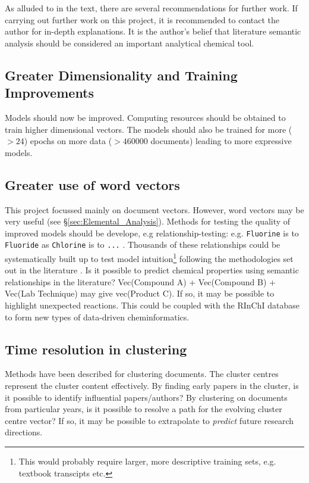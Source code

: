 \label{chapt:RECOMMENDATIONS}
As alluded to in the text, there are several recommendations for further work. If carrying out further work on this project, it is recommended to contact the author for in-depth explanations. It is the author's belief that literature semantic analysis should be considered an important analytical chemical tool.
\subsection{Greater Dimensionality and Training Improvements}
Models should now be improved. Computing resources should be obtained to train higher dimensional vectors. The models should also be trained for more ($> 24$) epochs on more data ($> 460000$ documents) leading to more expressive models.
\subsection{Greater use of word vectors}
\label{sec:recomm_word_vectors}
This project focussed mainly on document vectors. However, word vectors may be very useful (see \S\ref{sec:Elemental_Analysis}). Methods for testing the quality of improved models should be develope, e.g  relationship-testing: e.g. \texttt{Fluorine} is to \texttt{Fluoride} as \texttt{Chlorine} is to \texttt{...} . Thousands of these relationships could be systematically built up to test model intuition\footnote{This would probably require larger, more descriptive training sets, e.g. textbook transcipts etc.} following the methodologies set out in the literature \cite{word2vec1}\cite{word2vec2}. Is it possible to predict chemical properties using semantic relationships in the literature? Vec(Compound A) + Vec(Compound B) + Vec(Lab Technique) may give vec(Product C). If so, it may be possible to highlight unexpected reactions. This could be coupled with the RInChI database to form new types of data-driven cheminformatics.
\newpage
\null
\newpage
\subsection{Time resolution in clustering}
Methods have been described for clustering documents. The cluster centres represent the cluster content effectively. By finding early papers in the cluster, is it possible to identify influential papers/authors?
By clustering on documents from particular years, is it possible to resolve a path for the evolving cluster centre vector? If so, it may be possible to extrapolate to \emph{predict} future research directions.
